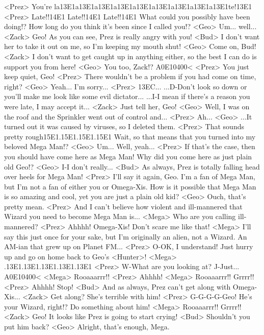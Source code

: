 <Prez> You're la{13}{E1}a{13}{E1}a{13}{E1}a{13}{E1}a{13}{E1}a{13}{E1}a{13}{E1}a{13}{E1}a{13}{E1}te!{13}{E1} 
<Prez> Late!!{14}{E1} Late!!{14}{E1} Late!!{14}{E1} 
What could you possibly have been doing!? 
How long do you think it's been since I called you!? 
<Geo> Um... well... 
<Zack> Geo! As you can see, Prez is really angry with you! 
<Bud> I don't want her to take it out on me, so I'm keeping my mouth shut! 
<Geo> Come on, Bud! 
<Zack> I don't want to get caught up in anything either, so 
the best I can do is support you from here! 
<Geo> You too, Zack!? 
{A0}{E1}{04}{00}< 
<Prez> You just keep quiet, Geo! 
<Prez> There wouldn't be a problem if you had come on time, right? 
<Geo> Yeah... I'm sorry... 
<Prez> {13}{EC}... 
...D-Don't look so down or you'll make me look like some evil dictator... 
...I-I mean if there's a reason you were late, I may accept it... 
<Zack> Just tell her, Geo! 
<Geo> Well, I was on the roof and the Sprinkler went out of control and... 
<Prez> Ah... 
<Geo> ...It turned out it was caused by viruses, so I deleted them. 
<Prez> That sounds pretty rough{15}{E1}.{15}{E1}.{15}{E1}.{15}{E1} 
Wait, so that means that you turned into my beloved Mega Man!? 
<Geo> Um... Well, yeah... 
<Prez> If that's the case, then you should have come here as Mega Man! 
Why did you come here as just plain old Geo!? 
<Geo> I-I don't really... 
<Bud> As always, Prez is totally falling head over heels for Mega Man! 
<Prez> I'll say it again, Geo. 
I'm a fan of Mega Man, but I'm not a fan of either you or Omega-Xis. 
How is it possible that Mega Man is so amazing 
and cool, yet you are just a plain old kid? 
<Geo> Ouch, that's pretty mean. 
<Prez> And I can't believe how violent and ill-mannered that 
Wizard you need to become Mega Man is... 
<Mega> Who are you calling ill-mannered? 
<Prez> Ahhhh! 
Omega-Xis! Don't scare me like that! 
<Mega> I'll say this just once for your sake, but I'm originally an alien, not a Wizard. 
An AM-ian that grew up on Planet FM... 
<Prez> O-OK, I understand! 
Just hurry up and go on home back to Geo's <Hunter>! 
<Mega> .{13}{E1}.{13}{E1}.{13}{E1}.{13}{E1}.{13}{E1} 
<Prez> W-What are you looking at? 
J-Just... 
{A0}{E1}{04}{00}< 
<Mega> Rooaaarrr!! 
<Prez> Ahhhh! 
<Mega> Rooaaarrr!! Grrrr!! 
<Prez> Ahhhh! Stop! 
<Bud> And as always, Prez can't get along with Omega-Xis... 
<Zack> Get along? She's terrible with him! 
<Prez> G-G-G-G-Geo! He's your Wizard, right!? Do something about him! 
<Mega> Rooaaarrr!! Grrrr!! 
<Zack> Geo! It looks like Prez is going to start crying! 
<Bud> Shouldn't you put him back? 
<Geo> Alright, that's enough, Mega. 
